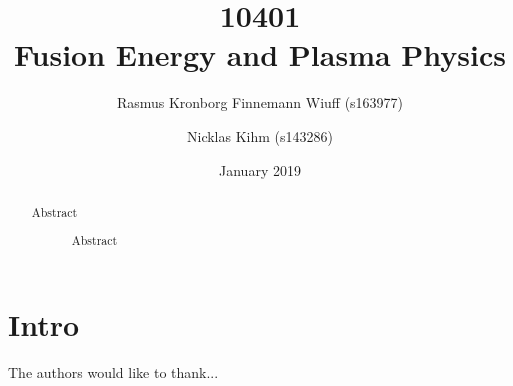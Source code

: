 \documentclass[aps, prb, a4paper, english, 12pt, twocolumn, longbibliography, amsmath, amssymb, colorinlistoftodos, floatfix]{revtex4-1}
\begin{document}
\begin{abstract}
	\begin{description}
		\item[Abstract] Abstract
	\end{description}
\end{abstract}

\title{10401\\Fusion Energy and Plasma Physics}
\date{January  2019}
\author{Rasmus Kronborg Finnemann Wiuff (s163977)}
\author{Nicklas Kihm (s143286)}
\maketitle


\tableofcontents

\makeatletter
\let\toc@pre\relax
\let\toc@post\relax
\makeatother

\thispagestyle{empty}
\setcounter{page}{1}

\section{Intro}

\begin{acknowledgments}
	The authors would like to thank...
\end{acknowledgments}

\newpage
\onecolumngrid


\newpage
\listoffigures
\listoftables
\listoflistings
\newpage

\end{document}
